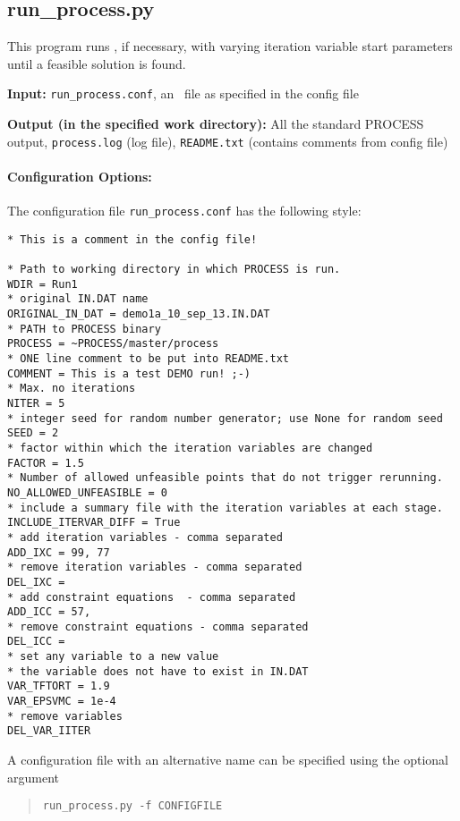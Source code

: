 \subsection{run\_process.py}

This program runs \process, if necessary, with varying iteration variable
start parameters until a feasible solution is found.

\begin{description}
\item{\textbf{Input:}}
\texttt{run\_process.conf}, an \indat\ file as specified in the config file
                                
\item{\textbf{Output (in the specified work directory):}} All the standard
  PROCESS output, \texttt{process.log} (log file), \texttt{README.txt}
  (contains comments from config file)
\end{description}

\paragraph{Configuration Options:}

The configuration file \texttt{run\_process.conf} has the following style:
\begin{framed}
\begin{verbatim}
* This is a comment in the config file!

* Path to working directory in which PROCESS is run.
WDIR = Run1
* original IN.DAT name 
ORIGINAL_IN_DAT = demo1a_10_sep_13.IN.DAT
* PATH to PROCESS binary
PROCESS = ~PROCESS/master/process
* ONE line comment to be put into README.txt
COMMENT = This is a test DEMO run! ;-)
* Max. no iterations
NITER = 5
* integer seed for random number generator; use None for random seed
SEED = 2
* factor within which the iteration variables are changed
FACTOR = 1.5
* Number of allowed unfeasible points that do not trigger rerunning.
NO_ALLOWED_UNFEASIBLE = 0 
* include a summary file with the iteration variables at each stage.
INCLUDE_ITERVAR_DIFF = True
* add iteration variables - comma separated
ADD_IXC = 99, 77
* remove iteration variables - comma separated
DEL_IXC = 
* add constraint equations  - comma separated 
ADD_ICC = 57,
* remove constraint equations - comma separated
DEL_ICC =
* set any variable to a new value
* the variable does not have to exist in IN.DAT
VAR_TFTORT = 1.9
VAR_EPSVMC = 1e-4
* remove variables
DEL_VAR_IITER
\end{verbatim}
\end{framed}
A configuration file with an alternative name can be specified using the optional argument
\begin{quote}
\begin{verbatim}
run_process.py -f CONFIGFILE
\end{verbatim}
\end{quote}

